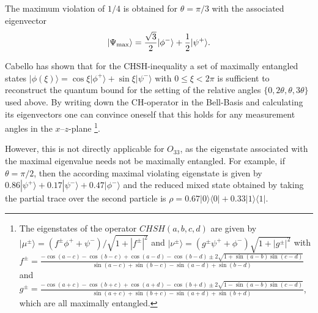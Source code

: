 \documentclass[prl,showpacs,showkeys,amsfonts,amsmath,twocolumn]{revtex4}
\newcommand{\ket}[1]{|#1\rangle}
\newcommand{\bra}[1]{\langle #1|}
\begin{document}
The maximum violation of $1/4$ is obtained for $\theta=\pi/3$ with the associated
eigenvector
\begin{equation}
  \ket{\Psi_{\rm max}}=\frac{\sqrt{3}}{2}\ket{\phi^-}+\frac{1}{2}\ket{\psi^+}.
\label{2004-qbounds-pmax33}
\end{equation}

Cabello \cite{cabello-2003a} has shown that for the CHSH-inequality a set of
maximally entangled states $\ket{\phi(\xi)} = \cos\xi\ket{\phi^+} +
\sin\xi\ket{\psi^-}$ with $0 \leq \xi < 2\pi$ is sufficient to
reconstruct the quantum bound for the setting of the relative angles
$\{0,2\theta,\theta,3\theta\}$ used above. By writing down the
CH-operator in the Bell-Basis and calculating its eigenvectors one can convince oneself that this holds
for any measurement angles in the 
$x$--$z$-plane
\footnote{The eigenstates of the operator $CHSH(a,b,c,d)$ are given by
  $\ket{\mu^\pm}=(f^\pm \phi^+ + \psi^-)/\sqrt{1+|f^\pm|^2}$ and $\ket{\nu^\pm}=(g^\pm
  \psi^+ + \phi^-)\sqrt{1+|g^\pm|^2}$ with 
  $f^\pm =\frac{-\cos(a-c)-\cos(b-c)+\cos(a-d)-\cos(b-d) \pm
  2\sqrt{1+\sin(a-b)\sin(c-d)}}{\sin(a-c)+\sin(b-c)-\sin(a-d) +\sin(b-d)}$ and $g^\pm = \frac{-\cos(a+c)-\cos(b+c)+\cos(a+d)-\cos(b+d) \pm
  2\sqrt{1-\sin(a-b)\sin(c-d)}}{\sin(a+c)+\sin(b+c)-\sin(a+d)
  +\sin(b+d)}$, which are all maximally entangled.}. 

However, this is not directly applicable for $O_{33}$, as
 the eigenstate associated with the maximal
eigenvalue needs not be maximally entangled.
For example, if $\theta=\pi/2$, then the according maximal violating eigenstate is given by $0.86
  \ket{\psi^+} + 0.17\ket{\psi^-} + 0.47\ket{\phi^-}$ and the
  reduced mixed state obtained by taking the partial trace over the
  second particle is $\rho = 0.67\ket{0}\bra{0} +
  0.33\ket{1}\bra{1}$.
\end{document}

